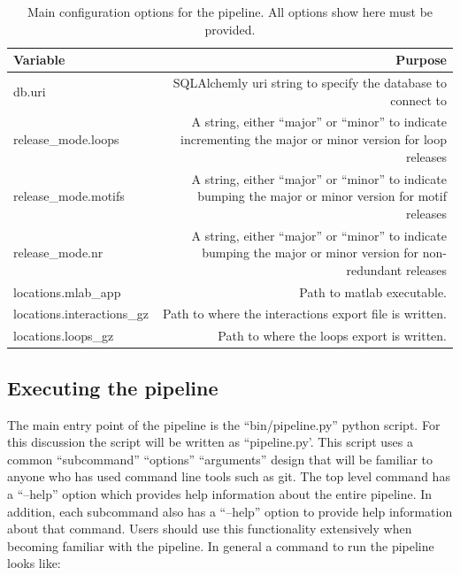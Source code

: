 \begin{table}[ht]
\begin{tabulary}{\linewidth}{LR}
\toprule
Variable & Purpose \\
\midrule

db.uri & SQLAlchemly uri string to specify the database to connect to \\

release\_mode.loops & A string, either ``major'' or ``minor'' to indicate
                        incrementing the major or minor version for loop releases \\

release\_mode.motifs & A string, either ``major'' or ``minor'' to indicate bumping
                        the major or minor version for motif releases \\

release\_mode.nr & A string, either ``major'' or ``minor'' to indicate bumping the
                   major or minor version for non- redundant releases \\

locations.mlab\_app & Path to matlab executable. \\

locations.interactions\_gz & Path to where the interactions export file is
                   written. \\

locations.loops\_gz & Path to where the loops export is written. \\

\bottomrule
\end{tabulary}
\caption{Main configuration options for the pipeline. All options show here must
  be provided.}
\label{tab:pipeline-config}
\end{table}

\subsection{Executing the pipeline}

The main entry point of the pipeline is the ``bin/pipeline.py'' python script. For
this discussion the script will be written as ``pipeline.py'. This script uses a
common ``subcommand'' ``options'' ``arguments'' design that will be familiar to anyone
who has used command line tools such as git. The top level command has a
``--help'' option which provides help information about the entire pipeline. In
addition, each subcommand also has a ``--help'' option to provide help information
about that command. Users should use this functionality extensively when
becoming familiar with the pipeline. In general a command to run the pipeline
looks like:

